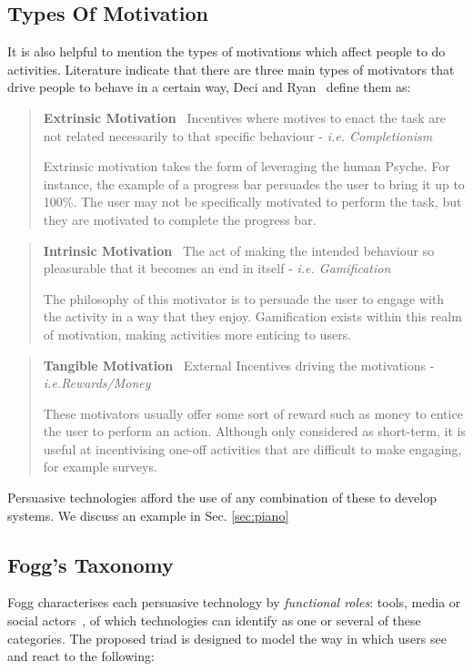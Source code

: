 \subsection{Types Of Motivation}
It is also helpful to mention the types of motivations which affect people to do activities. Literature indicate that there are three main types of motivators that drive people to behave in a certain way, Deci and Ryan~\cite{motivationtypes} define them as:
\begin{quotation}
\noindent
\textbf{Extrinsic Motivation}~ Incentives where motives to enact the task are not related necessarily to that specific behaviour - \textit{i.e. Completionism}

Extrinsic motivation takes the form of leveraging the human Psyche. For instance, the example of a progress bar persuades the user to bring it up to 100\%. The user may not be specifically motivated to perform the task, but they are motivated to complete the progress bar.
\end{quotation}
\begin{quotation}
\noindent
\textbf{Intrinsic Motivation}~ The act of making the intended behaviour so pleasurable that it becomes an end in itself - \textit{i.e. Gamification}

The philosophy of this motivator is to persuade the user to engage with the activity in a way that they enjoy. Gamification exists within this realm of motivation, making activities more enticing to users.
\end{quotation}
\begin{quotation}
\noindent
\textbf{Tangible Motivation}~ External Incentives driving the motivations - \textit{i.e.Rewards/Money}

These motivators usually offer some sort of reward such as money to entice the user to perform an action. Although only considered as short-term, it is useful at incentivising one-off activities that are difficult to make engaging, for example surveys. 
\end{quotation}

Persuasive technologies afford the use of any combination of these to develop systems. We discuss an example in Sec. \ref{sec:piano}

\subsection{Fogg's Taxonomy}
Fogg characterises each persuasive technology by \emph{functional roles}: tools, media or social actors~\cite{fogg1998persuasive}, of which technologies can identify as one or several of these categories. The proposed triad is designed to model the way in which users see and react to the following:

